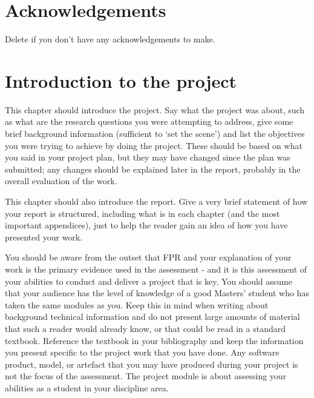 \documentclass[a4paper, notitlepage, 11pt]{article}
\begin{document}
\section*{Acknowledgements}
Delete if you don't have any acknowledgements to make.

\vspace{3em}

\tableofcontents

\section{Introduction to the project}

This chapter should introduce the project. Say what the project was about, such as what are the research  questions  you  were  attempting  to  address,  give  some  brief  background  information (sufficient to ‘set the scene’) and list the objectives  you were trying  to achieve by doing  the project.  These  should  be  based  on  what  you  said  in  your  project  plan,  but  they  may  have changed  since  the  plan  was  submitted;  any  changes  should  be  explained  later  in  the  report, probably in the overall evaluation of the work.  

This chapter should also introduce the report. Give a very brief statement of how your report is  structured,  including  what  is  in  each  chapter  (and  the  most  important  appendices),  just  to help the reader gain an idea of how you have presented your work.  

You should be aware from the outset that FPR and your explanation of your work is the primary evidence  used  in  the  assessment  -  and  it  is  this  assessment  of  your  abilities  to  conduct  and deliver a project that is key. You should assume that your audience has the level of knowledge of a good Masters' student who has taken the same modules as you. Keep this in mind when writing about background technical information and do not present large amounts of material that such a reader would already know, or that could be read in a standard textbook. Reference the textbook in your bibliography and keep the information you present specific to the project work that you have done. Any software product, model, or artefact that you may have produced during your project is not the focus of the assessment. The project module is about assessing your abilities as a student in your discipline area.  
\end{document}
